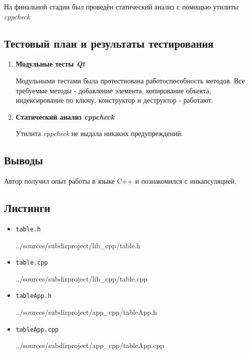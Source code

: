 \documentclass[12pt,a4paper]{report}
\begin{document}
На финальной стадии был проведён статический анализ с помощью утилиты \textit{cppcheck}%
\subsection{Тестовый план и результаты тестирования}
\hspace{\parindent}
\begin{enumerate}
\item \textbf{Модульные тесты \textit{Qt}}

Модульными тестами была протестиована работоспособность методов. Все требуемые методы - добавление элемента, копирование объекта, индексирование по ключу, конструктор и деструктор - работают.
\item \textbf{Статический анализ \textit{cppcheck}}

Утилита \textit{cppcheck} не выдала никаких предупреждений.
\end{enumerate}
\subsection{Выводы}
\hspace{\parindent}
Автор получил опыт работы в языке C++ и познакомился с инкапсуляцией.
\subsection*{Листинги}
\begin{itemize}
\item[] \verb-table.h-

{../sources/subdirproject/lib_cpp/table.h}

\item[] \verb-table.cpp-

{../sources/subdirproject/lib_cpp/table.cpp}

\item[] \verb-tableApp.h-

{../sources/subdirproject/app_cpp/tableApp.h}

\item[] \verb-tableApp.cpp-

{../sources/subdirproject/app_cpp/tableApp.cpp}
\end{itemize}

%
\end{document}
